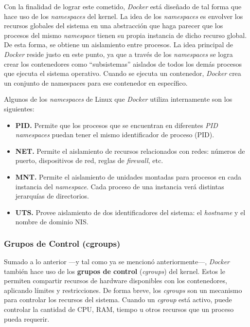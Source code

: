 \documentclass[12pt, letterpaper]{article}
\begin{document}
Con la finalidad de lograr este cometido, \textit{Docker} está diseñado de tal 
forma que hace uso de los \textit{namespaces} del kernel. La idea de los 
\textit{namespaces} es envolver los recursos globales del sistema en una 
abstracción que haga parecer que los procesos del mismo \textit{namespace} 
tienen su propia instancia de dicho recurso global. De esta forma, se obtiene 
un aislamiento entre procesos.  La idea principal de \textit{Docker} reside 
justo en este punto, ya que a través de los \textit{namespaces} se logra crear 
los contenedores como ``subsistemas'' aislados de todos los demás procesos que 
ejecuta el sistema operativo. Cuando se ejecuta un contenedor, \textit{Docker} 
crea un conjunto de namespaces para ese contenedor en específico.

Algunos de los \textit{namespaces} de Linux que \textit{Docker} utiliza 
internamente son los siguientes:
\begin{itemize}
  \item \textbf{PID.} Permite que los procesos que se encuentran en diferentes 
    \textit{PID namespaces} puedan tener el mismo identificador de proceso 
    (PID).
  \item \textbf{NET.} Permite el aislamiento de recursos relacionados con 
    redes: números de puerto, dispositivos de red, reglas de 
    \textit{firewall}, etc.
  \item \textbf{MNT.} Permite el aislamiento de unidades montadas para 
    procesos en cada instancia del \textit{namespace}. Cada proceso de una 
    instancia verá distintas jerarquías de directorios.
  \item \textbf{UTS.} Provee aislamiento de dos identificadores del sistema: 
    el \textit{hostname} y el nombre de dominio NIS.
\end{itemize}

\subsubsection{Grupos de Control (cgroups)}
Sumado a lo anterior ---y tal como ya se mencionó anteriormente---, 
\textit{Docker} también hace uso de los \textbf{grupos de control} 
(\textit{cgroups}) del kernel.  Estos le permiten compartir recursos de 
hardware disponibles con los contenedores, aplicando límites y restricciones.  
De forma breve, los \textit{cgroups} son un mecanismo para controlar los 
recursos del sistema. Cuando un \textit{cgroup} está activo, puede controlar 
la cantidad de CPU, RAM, tiempo u otros recursos que un proceso pueda 
requerir.
\end{document}
